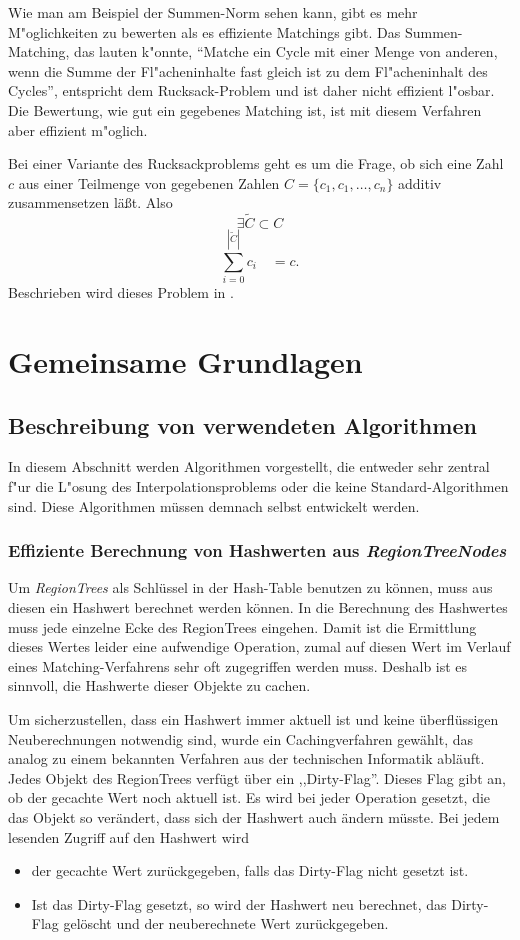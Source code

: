 Wie man am Beispiel der Summen-Norm sehen kann, gibt es mehr M"oglichkeiten zu bewerten als es effiziente Matchings gibt. Das Summen-Matching, das lauten k"onnte, "`Matche ein Cycle mit  einer Menge von anderen, wenn die Summe der Fl"acheninhalte fast gleich ist zu dem Fl"acheninhalt des Cycles"', entspricht dem Rucksack-Problem und ist daher nicht effizient l"osbar. Die Bewertung, wie gut ein gegebenes Matching ist, ist mit diesem Verfahren aber effizient m"oglich.

Bei einer Variante des Rucksackproblems geht es um die Frage, ob sich eine Zahl $c$ aus einer Teilmenge von gegebenen Zahlen $C=\{c_1,c_1,\hdots,c_n\}$ additiv zusammensetzen läßt. Also 
 $$\exists \tilde{C}\subset C$$ 
$$\sum_{i=0}^{|\tilde{C}|} c_i\quad = c.$$ Beschrieben wird dieses Problem in \cite{Ruck}.

\section{Gemeinsame Grundlagen}

\subsection{Beschreibung von verwendeten Algorithmen} \label{Algorithmen}
In diesem Abschnitt werden Algorithmen vorgestellt, die entweder sehr zentral f"ur die L"osung des Interpolationsproblems oder die keine Standard-Algorithmen sind. Diese Algorithmen müssen demnach selbst entwickelt werden.

\subsubsection{Effiziente Berechnung von Hashwerten aus \textit{RegionTreeNodes}}\label{berechenHashwerte}

Um \textit{RegionTrees} als Schlüssel in der Hash-Table benutzen zu können, muss aus diesen ein Hashwert berechnet werden können. In die Berechnung des Hashwertes muss jede einzelne Ecke des RegionTrees eingehen. Damit ist die Ermittlung dieses Wertes leider eine aufwendige Operation, zumal auf diesen Wert im Verlauf eines Matching-Verfahrens sehr oft zugegriffen werden muss. Deshalb ist es sinnvoll, die Hashwerte dieser Objekte zu cachen. 

Um sicherzustellen, dass ein Hashwert immer aktuell ist und keine überflüssigen Neuberechnungen notwendig sind, wurde ein Cachingverfahren gewählt, das analog zu einem bekannten Verfahren aus der technischen Informatik abläuft. Jedes Objekt des RegionTrees verfügt über ein ,,Dirty-Flag''. Dieses Flag gibt an, ob der gecachte Wert noch aktuell ist. Es wird bei jeder Operation gesetzt, die das Objekt so verändert, dass sich der Hashwert auch ändern müsste. Bei jedem lesenden Zugriff auf den Hashwert wird 
\begin{itemize}
\item der gecachte Wert zurückgegeben, falls das Dirty-Flag nicht gesetzt ist.
\item Ist das Dirty-Flag gesetzt, so wird der Hashwert neu berechnet, das Dirty-Flag gelöscht und der neuberechnete Wert zurückgegeben.
\end{itemize}

